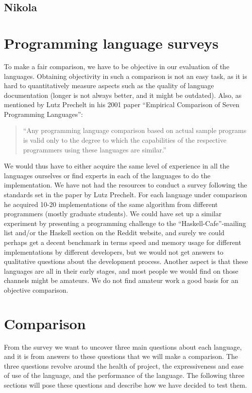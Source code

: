 \subsection{Nikola}

\section{Programming language surveys}
To make a fair comparison, we have to be objective in our evaluation
of the languages. Obtaining objectivity in such a comparison is not
an easy task, as it is hard to quantitatively measure aspects such as
the quality of language documentation (longer is not always better,
and it might be outdated). Also, as mentioned by Lutz Prechelt in his
2001 paper ``Empirical Comparison of Seven Programming Languages'':

\begin{quote}
  ``Any programming language comparison based on actual sample programs
  is valid only to the degree to which the capabilities of the
  respective programmers using these languages are similar.''
\end{quote}

We would thus have to either acquire the same level of experience in all the
languages ourselves or find experts in each of the languages to do the
implementation. We have not had the resources to conduct a survey
following the standards set in the paper by Lutz Prechelt. For each
language under comparison he acquired 10-20 implementations of the
same algorithm from different programmers (mostly graduate
students). We could have set up a similar experiment by presenting a
programming challenge to the ``Haskell-Cafe''-mailing list and/or the
Haskell section on the Reddit website, and surely we could perhaps get
a decent benchmark in terms speed and memory usage for different
implementations by different developers, but we would not get answers
to qualitative questions about the development process. Another aspect
is that these languages are all in their early stages, and most people
we would find on those channels might be amateurs. We do not find
amateur work a good basis for an objective comparison.


\section{Comparison}
From the survey we want to uncover three main questions about each
language, and it is from answers to these questions that we will make
a comparison. The three questions revolve around the health of
project, the expressiveness and ease of use of the language, and the
performance of the language. The following three sections will pose
these questions and describe how we have decided to test them.

